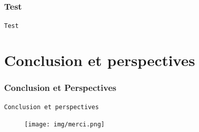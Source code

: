 \documentclass[11pt]{beamer}
\begin{document}
 \begin{frame}
  \frametitle{Test}
 	\begin{center}
 		\LARGE{\texttt{Test}}
 	\end{center}
 \end{frame} 
 
 \section{Conclusion et perspectives}
 \begin{frame}
  \frametitle{Conclusion et Perspectives}
 	\begin{center}
 		\LARGE{\texttt{Conclusion et perspectives}}
 	\end{center}
 \end{frame}
 
 \begin{frame}
 	\begin{figure}[!h]
		\begin{center}
			\texttt{[image: img/merci.png]}
		\end{center}
 \end{figure}
 \end{frame}
 
% 
 
 
\end{document}
